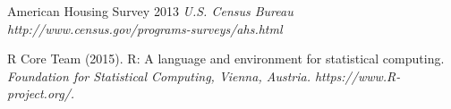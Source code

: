 \documentclass[twoside]{article}
\begin{document}
\begin{multicols}{2}
\begin{thebibliography}{99}
American Housing Survey 2013 {\em U.S. Census Bureau http://www.census.gov/programs-surveys/ahs.html}

R Core Team (2015). R: A language and environment for statistical computing. {\em Foundation for Statistical Computing, Vienna, Austria. https://www.R-project.org/.}


\end{thebibliography}


\end{multicols}
\end{document}
